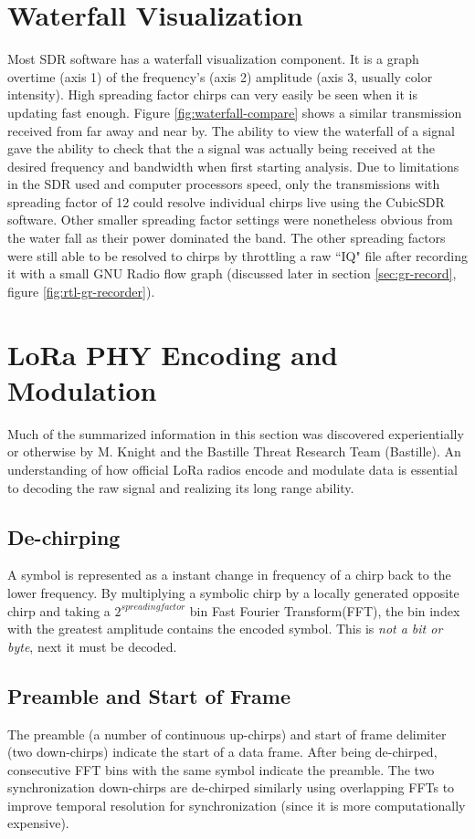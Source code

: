 \documentclass[conference, compsoc]{IEEEtran}
\begin{document}
\section{Waterfall Visualization}
Most SDR software has a waterfall visualization component. It is a graph overtime (axis 1) of the frequency's (axis 2) amplitude (axis 3, usually color intensity). High spreading factor chirps can very easily be seen when it is updating fast enough. Figure \ref{fig:waterfall-compare} shows a similar transmission received from far away and near by. The ability to view the waterfall of a signal gave the ability to check that the a signal was actually being received at the desired frequency and bandwidth when first starting analysis. Due to limitations in the SDR used and computer processors speed, only the transmissions with spreading factor of 12 could resolve individual chirps live using the CubicSDR software. Other smaller spreading factor settings were nonetheless obvious from the water fall as their power dominated the band. The other spreading factors were still able to be resolved to chirps by throttling a raw ``IQ" file after recording it with a small GNU Radio flow graph (discussed later in section \ref{sec:gr-record}, figure \ref{fig:rtl-gr-recorder}).

\section{LoRa PHY Encoding and Modulation}
\label{sec:EncAndMod}

Much of the summarized information in this section was discovered experientially or otherwise by M. Knight and the Bastille Threat Research Team (Bastille)\cite{grcon}. An understanding of how official LoRa radios encode and modulate data is essential to decoding the raw signal and realizing its long range ability.

\subsection{De-chirping}
A symbol is represented as a instant change in frequency of a chirp back to the lower frequency. By multiplying a symbolic chirp by a locally generated opposite chirp and taking a $2^{spreading factor}$ bin Fast Fourier Transform(FFT), the bin index with the greatest amplitude contains the encoded symbol. This is \textit{not a bit or byte}, next it must be decoded.

\subsection{Preamble and Start of Frame}
The preamble (a number of continuous up-chirps) and start of frame delimiter (two down-chirps) indicate the start of a data frame. After being de-chirped, consecutive FFT bins with the same symbol indicate the preamble. The two synchronization down-chirps are de-chirped similarly using overlapping FFTs to improve temporal resolution for synchronization (since it is more computationally expensive).
\end{document}
